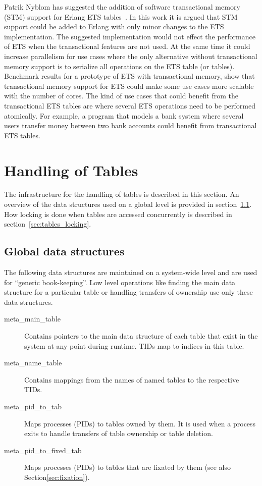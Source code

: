 \documentclass[aps,pre,preprint,nofootinbib]{revtex4}
\begin{document}
Patrik Nyblom has suggested the addition of software transactional memory (STM) support for Erlang ETS tables~\cite{PatrikErlangTrans}.
In this work it is argued that STM support could be added to Erlang with only minor changes to the ETS implementation.
The suggested implementation would not effect the performance of ETS when the transactional features are not used.
At the same time it could increase parallelism for use cases where the only alternative without transactional memory support is to serialize all operations on the ETS table (or tables).
Benchmark results for a prototype of ETS with transactional memory, show that transactional memory support for ETS could make some use cases more scalable with the number of cores.
The kind of use cases that could benefit from the transactional ETS tables are where several ETS operations need to be performed atomically.
For example, a program that models a bank system where several users transfer money between two bank accounts could benefit from transactional ETS tables.

\section{Handling of Tables}

The infrastructure for the handling of tables is described in this section.
An overview of the data structures used on a global level is provided in section~\ref{sec:tables_overview}.
How locking is done when tables are accessed concurrently is described in section~\ref{sec:tables_locking}.

\subsection{Global data structures}
\label{sec:tables_overview}

The following data structures are maintained on a system-wide level and are used for ``generic book-keeping''.
Low level operations like finding the main data structure for a particular table or handling transfers of ownership use only these data structures.

\begin{description}
\item[meta\_main\_table]
  Contains pointers to the main data structure of each table that exist in the system at any point during runtime.
  TIDs map to indices in this table.
\item[meta\_name\_table]
  Contains mappings from the names of named tables to the respective TIDs.
\item[meta\_pid\_to\_tab]
  Maps processes (PIDs) to tables owned by them.
  It is used when a process exits to handle transfers of table ownership or table deletion.
\item[meta\_pid\_to\_fixed\_tab]
  Maps processes (PIDs) to tables that are fixated by them (see also Section\ref{sec:fixation}).
\end{description}
\end{document}
